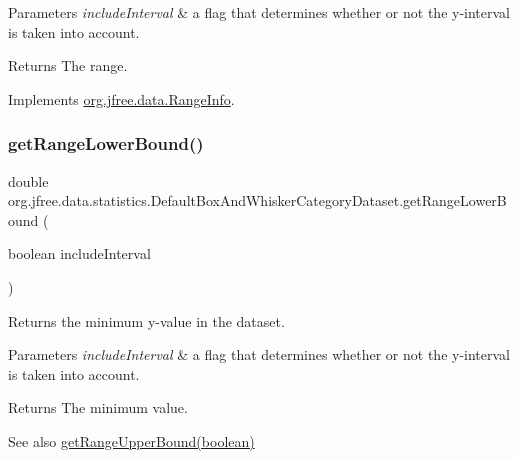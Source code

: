 \begin{DoxyParams}{Parameters}
{\em include\+Interval} & a flag that determines whether or not the y-\/interval is taken into account.\\
\hline
\end{DoxyParams}
\begin{DoxyReturn}{Returns}
The range. 
\end{DoxyReturn}


Implements \mbox{\hyperlink{interfaceorg_1_1jfree_1_1data_1_1_range_info_a2752094d868839b5565131a5bdd8e75e}{org.\+jfree.\+data.\+Range\+Info}}.

\mbox{\label{classorg_1_1jfree_1_1data_1_1statistics_1_1_default_box_and_whisker_category_dataset_a29a3b0a95d9a09ab05cf0063254a5025}} 
\subsubsection{\texorpdfstring{get\+Range\+Lower\+Bound()}{getRangeLowerBound()}}
{\footnotesize\ttfamily double org.\+jfree.\+data.\+statistics.\+Default\+Box\+And\+Whisker\+Category\+Dataset.\+get\+Range\+Lower\+Bound (\begin{DoxyParamCaption}\item[{boolean}]{include\+Interval }\end{DoxyParamCaption})}

Returns the minimum y-\/value in the dataset.


\begin{DoxyParams}{Parameters}
{\em include\+Interval} & a flag that determines whether or not the y-\/interval is taken into account.\\
\hline
\end{DoxyParams}
\begin{DoxyReturn}{Returns}
The minimum value.
\end{DoxyReturn}
\begin{DoxySeeAlso}{See also}
\mbox{\hyperlink{classorg_1_1jfree_1_1data_1_1statistics_1_1_default_box_and_whisker_category_dataset_a32f1be24a5e0f73dd538f73ee8c4bd40}{get\+Range\+Upper\+Bound(boolean)}} 
\end{DoxySeeAlso}



